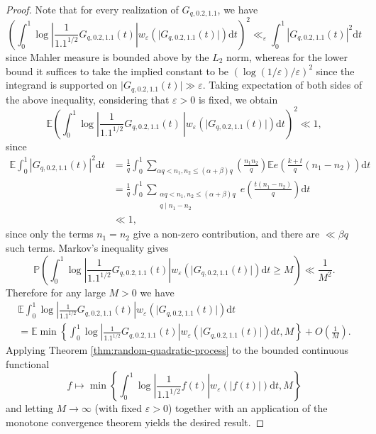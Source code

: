 \documentclass[12pt, a4paper]{amsart}
\theoremstyle{remark}
\newcommand{\ud}{\mathrm{d}}
\begin{document}
\begin{proof}
    Note that for every realization of $G_{q, 0.2, 1.1}$, we have 
    \begin{equation*}
        \left(\int_0^1 \log\left\lvert\frac{1}{1.1^{1/2}}G_{q, 0.2, 1.1}(t) \right\rvert w_{\varepsilon}(\lvert G_{q, 0.2, 1.1}(t)\rvert)\ud t\right)^2\ll_{\varepsilon} \int_0^1 \left\lvert G_{q, 0.2, 1.1}(t) \right\rvert^2 \ud t
    \end{equation*}
    since Mahler measure is bounded above by the $L_2$ norm, whereas for the lower bound it suffices to take the implied constant to be $(\log(1/\varepsilon)/\varepsilon)^2$ since the integrand is supported on $\lvert G_{q, 0.2, 1.1}(t)\rvert\gg \varepsilon$.
    Taking expectation of both sides of the above inequality, considering that $\varepsilon>0$ is fixed, we obtain 
    \begin{equation*}
        \mathbb E\left(\int_0^1 \log\left\lvert\frac{1}{1.1^{1/2}}G_{q, 0.2, 1.1}(t)\ \right\rvert w_{\varepsilon}(\lvert G_{q, 0.2, 1.1}(t)\rvert)\ud t\right)^2\ll 1,
    \end{equation*} since
    \begin{align*}
        \mathbb E\int_0^1 \left\lvert G_{q, 0.2, 1.1}(t) \right\rvert^2 \ud t & = \frac{1}{q}\int_0^1 \sum_{\alpha q<n_1, n_2\leq (\alpha+\beta)q} \left( \frac{n_1n_2}{q}\right) \mathbb Ee\left(\frac{k+t}{q}(n_1-n_2) \right)\ud t \\ & = \frac{1}{q}\int_0^1 \sum_{\substack{\alpha q <n_1, n_2\leq (\alpha+\beta)q \\ q\mid n_1-n_2}} e\left(\frac{t(n_1-n_2)}{q} \right)\ud t
        \\ & \ll 1,
    \end{align*}
    since only the terms $n_1=n_2$ give a non-zero contribution, and there are $\ll \beta q$ such terms. Markov's inequality gives 
    \begin{equation*}
        \mathbb P \left(\int_0^1 \log\left\lvert\frac{1}{1.1^{1/2}}G_{q, 0.2, 1.1}(t) \right\rvert w_{\varepsilon}(\lvert G_{q, 0.2, 1.1}(t)\rvert)\ud t\geq M  \right)\ll \frac{1}{M^2}.
    \end{equation*}
    Therefore for any large $M>0$ we have 
    \begin{multline*}
        \mathbb E \int_0^1 \log\left\lvert\frac{1}{1.1^{1/2}}G_{q, 0.2, 1.1}(t)\right\rvert w_{\varepsilon}(\lvert G_{q, 0.2, 1.1}(t)\rvert)\ud t 
        \\ = \mathbb E \min\left\{\int_0^1 \log\left\lvert\frac{1}{1.1^{1/2}}G_{q, 0.2, 1.1}(t) \right\rvert w_{\varepsilon}(\lvert G_{q, 0.2, 1.1}(t)\rvert)\ud t, M \right\} + O\left(\frac{1}{M} \right). 
    \end{multline*}
    Applying Theorem \ref{thm:random-quadratic-process} to the bounded continuous functional $$f\mapsto \min\left\{\int_0^1 \log\left\lvert\frac{1}{1.1^{1/2}}f(t) \right\rvert w_{\varepsilon}(\lvert f(t)\rvert)\ud t, M \right\}$$ and letting $M\to\infty$ (with fixed $\varepsilon>0$) together with an application of the monotone convergence theorem yields the desired result. 
\end{proof}
\end{document}
